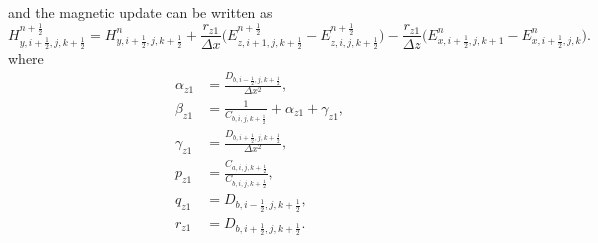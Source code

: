 \documentclass{article}
\numberwithin{equation}{section}
\numberwithin{figure}{section}
\begin{document}
and the magnetic update can be written as
\begin{equation}
    H_{y,i+\tfrac12,j,k+\tfrac12}^{n+\frac12} = H_{y,i+\tfrac12,j,k+\tfrac12}^{n} + \frac{r_{z1}}{\Delta x}\Big(E_{z,i+1,j,k+\tfrac12}^{n+\frac12}-E_{z,i,j,k+\tfrac12}^{n+\frac12}\Big) - \frac{r_{z1}}{\Delta z}\Big(E_{x,i+\tfrac12,j,k+1}^{n}-E_{x,i+\tfrac12,j,k}^{n}\Big).
    \label{eq:adi-first-hy}
\end{equation}
where
\begin{align}
    \alpha_{z1} & =\frac{D_{b,i-\tfrac12,j,k+\tfrac12}}{\Delta x^2},       \\
    \beta_{z1}  & =\frac{1}{C_{b,i,j,k+\tfrac12}}+\alpha_{z1}+\gamma_{z1}, \\
    \gamma_{z1} & =\frac{D_{b,i+\tfrac12,j,k+\tfrac12}}{\Delta x^2},       \\
    p_{z1}      & =\frac{C_{a,i,j,k+\tfrac12}}{C_{b,i,j,k+\tfrac12}},      \\
    q_{z1}      & =D_{b,i-\tfrac12,j,k+\tfrac12},                          \\
    r_{z1}      & =D_{b,i+\tfrac12,j,k+\tfrac12}.
\end{align}
\end{document}
